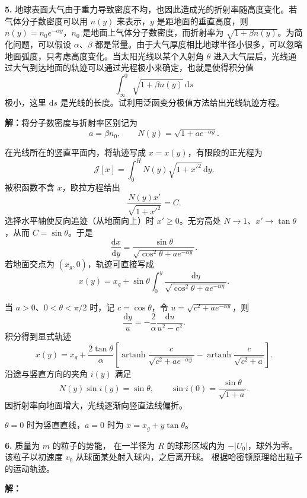 \documentclass[11pt,a4paper]{ctexart}
\begin{document}
\noindent\textbf{5.} 地球表面大气由于重力导致密度不均，也因此造成光的折射率随高度变化。若气体分子数密度可以用 $n(y)$ 来表示，$y$ 是距地面的垂直高度，则 $n(y)=n_0e^{-\alpha y}$，$n_0$ 是地面上气体分子数密度，而折射率为 $\sqrt{1+\beta n(y)}$。为简化问题，可以假设 $\alpha$、$\beta$ 都是常量。由于大气厚度相比地球半径小很多，可以忽略地面弧度，只考虑高度变化。当太阳光线以某个入射角 $\theta$ 进入大气层后，光线通过大气到达地面的轨迹可以通过光程极小来确定，也就是使得积分值
\[
\int_{\infty}^{0}\sqrt{1+\beta n(y)}\,\mathrm ds
\]
极小，这里 $\mathrm ds$ 是光线的长度。试利用泛函变分极值方法给出光线轨迹方程。

\noindent\textbf{解：}将分子数密度与折射率区别记为
\[
a=\beta n_0,\qquad N(y)=\sqrt{1+ae^{-\alpha y}}.
\]

在光线所在的竖直平面内，将轨迹写成 $x=x(y)$，有限段的正光程为
\[
\mathcal J[x]=\int_0^H N(y)\sqrt{1+x'^2}\,\mathrm dy.
\]
被积函数不含 $x$，欧拉方程给出
\[
\frac{N(y)x'}{\sqrt{1+x'^2}}=C.
\]
选择水平轴使反向追迹（从地面向上）时 $x'\ge0$。无穷高处 $N\to1$、$x'\to\tan\theta$，从而 $C=\sin\theta$。于是
\[
{\frac{\mathrm dx}{\mathrm dy}=\frac{\sin\theta}{\sqrt{\cos^2\theta+ae^{-\alpha y}}}}.
\]
若地面交点为 $(x_g,0)$，轨迹可直接写成
\[
{x(y)=x_g+\sin\theta\int_0^y\frac{\mathrm d\eta}{\sqrt{\cos^2\theta+ae^{-\alpha\eta}}}}.
\]

当 $a>0$、$0<\theta<\pi/2$ 时，记 $c=\cos\theta$，令 $u=\sqrt{c^2+ae^{-\alpha y}}$，则
\[
\frac{\mathrm dy}{u}=-\frac2\alpha\frac{\mathrm du}{u^2-c^2}.
\]
积分得到显式轨迹
\[
{x(y)=x_g+\frac{2\tan\theta}{\alpha}
\left[\operatorname{artanh}\frac{c}{\sqrt{c^2+ae^{-\alpha y}}}
-\operatorname{artanh}\frac{c}{\sqrt{c^2+a}}\right]}.
\]
沿途与竖直方向的夹角 $i(y)$ 满足
\[
{N(y)\sin i(y)=\sin\theta},\qquad
\sin i(0)=\frac{\sin\theta}{\sqrt{1+a}}.
\]
因折射率向地面增大，光线逐渐向竖直法线偏折。

$\theta=0$ 时为竖直直线，$a=0$ 时为 $x=x_g+y\tan\theta$。


\noindent\textbf{6.} 质量为 $m$ 的粒子的势能，
在一半径为 $R$ 的球形区域内为 $-|U_0|$，球外为零。
该粒子以初速度 $v_0$ 从球面某处射入球内，之后离开球。
根据哈密顿原理给出粒子的运动轨迹。


\begin{center}
\end{center}
\noindent\textbf{解：}
\end{document}

